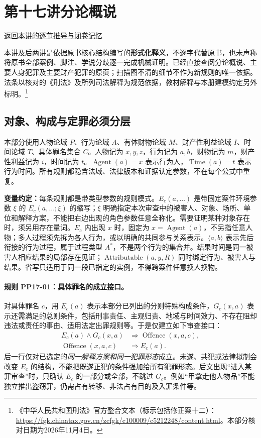 
\section{第十七讲\quad 分论概说}

\label{ref:lecture:17}

\noindent\hyperref[lecture:17]{返回本讲的逐节推导与闭卷记忆}

本讲及后两讲是依据原书核心结构编写的\textbf{形式化释义}，不逐字代替原书，也未声称将原书全部案例、脚注、学说分歧逐一完成机械证明。已经直接查阅分论概说、主要人身犯罪及主要财产犯罪的原页；扫描图不清的细节不作为新规则的唯一依据。法条以核对的《刑法》及所列司法解释为规范依据，教材解释与本册建模约定另外标明。\footnote{《中华人民共和国刑法》官方整合文本（标示包括修正案十二）：\url{https://fgk.chinatax.gov.cn/zcfgk/c100009/c5212248/content.html}。本部分核对日期为2026年11月4日。}

\subsection{对象、构成与定罪必须分层}
本部分使用人物论域 $P$、行为论域 $A$、有体财物论域 $M$、财产性利益论域 $I$、时间论域 $T$、具体罪名集合 $C$。人物记为 $x,y,z$，行为记为 $a,b$，财物记为 $m$，财产性利益记为 $i$，时间记为 $t$。$\operatorname{Agent}(a)=x$ 表示行为人，$\operatorname{Time}(a)=t$ 表示行为时间。所有规则都隐含法域、法律版本和证据认定参数，不在每个公式中重复。

\textbf{变量约定：}每条规则都是带类型参数的规则模式。$E_c(a,\ldots)$ 是带固定案件环境参数 $\xi$ 的 $E_c(a,\ldots;\xi)$ 的缩写；$\xi$ 明确指定本次审查中的被害人、对象、场所、单位和解释方案，不能把右边出现的角色参数任意全称化。需要证明某种对象存在时，须另用存在量词。$E_c$ 内出现 $x$ 时，固定为 $x=\operatorname{Agent}(a)$，不另指任意人物；多人过程须先拆为各人行为，或以明确的共同参与关系表示。$\langle a,b\rangle$ 表示先后衔接的行为过程，属于过程类型 $A^*$，不是两个行为的集合并。结果时间是同一被害人相应结果的局部存在见证；$\operatorname{Attributable}(a,y,R)$ 同时绑定行为、被害人与结果。省写只适用于同一段已指定的实例，不得跨案件任意换人换物。

\paragraph{规则 PP17-01：具体罪名的成立接口。}
\mbox{}\par
对具体罪名 $c$，用 $E_c(a)$ 表示本部分已列出的分则特殊构成条件，$G_c(x,a)$ 表示还需满足的总则条件，包括刑事责任、主观归责、地域与时间效力、不存在阻却违法或责任的事由、适用法定出罪规则等。于是仅建立如下审查接口：
\[
\begin{aligned}
E_c(a)\land G_c(x,a)&\Longrightarrow\operatorname{Offence}(x,a,c),\\
\operatorname{Offence}(x,a,c)&\Longrightarrow E_c(a).
\end{aligned}
\]
后一行仅对已选定的\emph{同一解释方案和同一犯罪形态}成立。未遂、共犯或法律拟制会改变 $E_c$ 的结构，不能把既遂正犯的条件强加给所有犯罪形态。后文出现“进入某罪审查”时，只确认 $E_c$ 的一部分或全部，不跳过 $G_c$。例如“甲拿走他人物品”不能独立推出盗窃罪，仍需占有转移、非法占有目的及入罪条件等。


